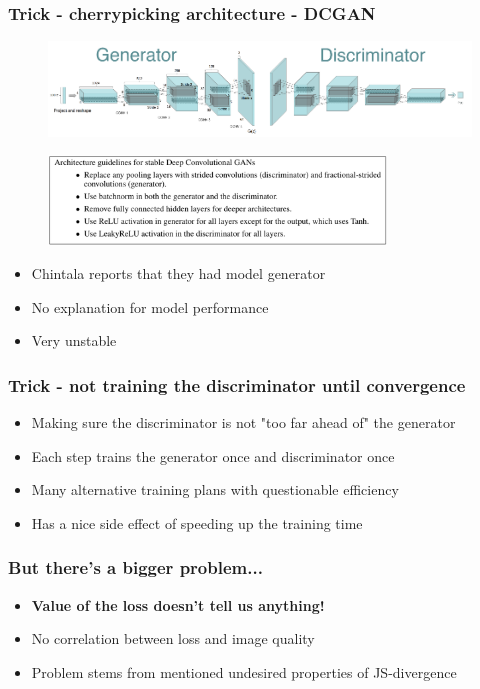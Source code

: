 \documentclass{Bredelebeamer}
\begin{document}
\begin{frame}
	\frametitle{Trick - cherrypicking architecture - DCGAN}
	\begin{figure}[h!]
		\centering
		\includegraphics[width=\textwidth]{dcgan_both.png}
	\end{figure}
	\pause
	\begin{figure}[h!]
		\centering
		\includegraphics[width=0.8\textwidth]{gan_guidelines.png}
	\end{figure}
	\pause
	\begin{itemize}[<+(1)->]
		\item Chintala reports that they had model generator \footnotemark
		\item No explanation for model performance
		\item Very unstable
	\end{itemize}
\end{frame}
\begin{frame}
	\frametitle{Trick - not training the discriminator until convergence}
	\begin{itemize}[<+->]
		\item Making sure the discriminator is not "too far ahead of" the generator
		\item Each step trains the generator once and discriminator once
		\item Many alternative training plans with questionable efficiency
		\item Has a nice side effect of speeding up the training time
	\end{itemize}
\end{frame}
\begin{frame}
	\frametitle{But there's a bigger problem...}
	\begin{itemize}
		\item \textbf{Value of the loss doesn't tell us anything!}
		\item No correlation between loss and image quality
		\item Problem stems from mentioned undesired properties of JS-divergence
	\end{itemize}
\end{frame}
\end{document}
